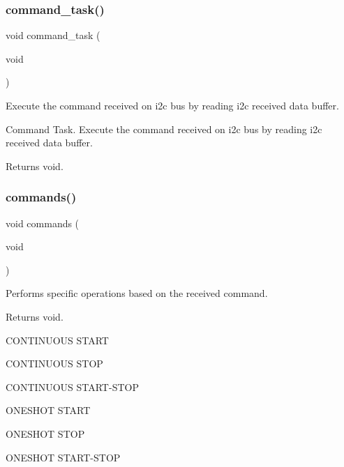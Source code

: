 \subsubsection{\texorpdfstring{command\+\_\+task()}{command\_task()}}
{\footnotesize\ttfamily void command\+\_\+task (\begin{DoxyParamCaption}\item[{void}]{ }\end{DoxyParamCaption})}



Execute the command received on i2c bus by reading i2c received data buffer. 

Command Task. Execute the command received on i2c bus by reading i2c received data buffer.

\begin{DoxyReturn}{Returns}
void. 
\end{DoxyReturn}
\mbox{\label{i2c-th_8ino_a4981066e183f1432ffd6eddf55826585}} 
\subsubsection{\texorpdfstring{commands()}{commands()}}
{\footnotesize\ttfamily void commands (\begin{DoxyParamCaption}\item[{void}]{ }\end{DoxyParamCaption})}



Performs specific operations based on the received command. 

\begin{DoxyReturn}{Returns}
void. 
\end{DoxyReturn}
C\+O\+N\+T\+I\+N\+U\+O\+US S\+T\+A\+RT

C\+O\+N\+T\+I\+N\+U\+O\+US S\+T\+OP

C\+O\+N\+T\+I\+N\+U\+O\+US S\+T\+A\+R\+T-\/\+S\+T\+OP

O\+N\+E\+S\+H\+OT S\+T\+A\+RT

O\+N\+E\+S\+H\+OT S\+T\+OP

O\+N\+E\+S\+H\+OT S\+T\+A\+R\+T-\/\+S\+T\+OP \mbox{\label{i2c-th_8ino_a46696a96b3118b5d8900703c054166c8}} 
